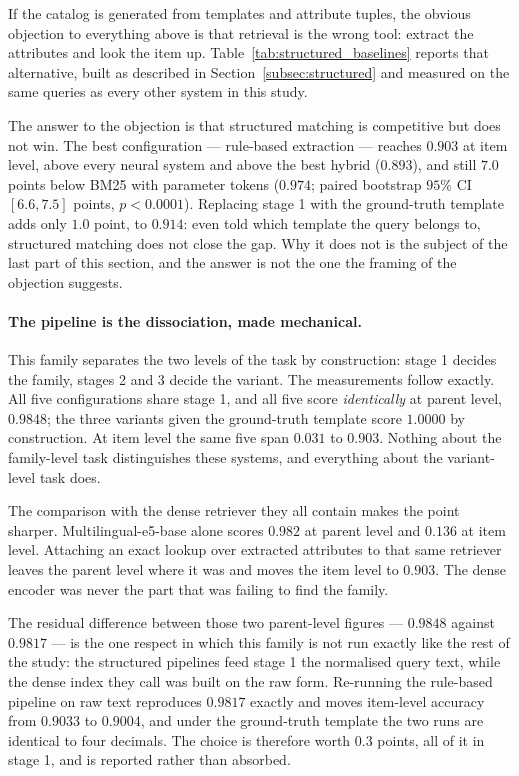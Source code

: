 \documentclass[preprint,12pt]{elsarticle}
\begin{document}
If the catalog is generated from templates and attribute tuples, the obvious objection to everything above is that retrieval is the wrong tool: extract the attributes and look the item up. Table~\ref{tab:structured_baselines} reports that alternative, built as described in Section~\ref{subsec:structured} and measured on the same queries as every other system in this study.



The answer to the objection is that structured matching is competitive but does not win. The best configuration --- rule-based extraction --- reaches $0.903$ at item level, above every neural system and above the best hybrid ($0.893$), and still $7.0$ points below BM25 with parameter tokens ($0.974$; paired bootstrap $95\%$ CI $[6.6, 7.5]$ points, $p < 0.0001$). Replacing stage 1 with the ground-truth template adds only $1.0$ point, to $0.914$: even told which template the query belongs to, structured matching does not close the gap. Why it does not is the subject of the last part of this section, and the answer is not the one the framing of the objection suggests.

\paragraph{The pipeline is the dissociation, made mechanical.}
This family separates the two levels of the task by construction: stage 1 decides the family, stages 2 and 3 decide the variant. The measurements follow exactly. All five configurations share stage 1, and all five score \emph{identically} at parent level, $0.9848$; the three variants given the ground-truth template score $1.0000$ by construction. At item level the same five span $0.031$ to $0.903$. Nothing about the family-level task distinguishes these systems, and everything about the variant-level task does.

The comparison with the dense retriever they all contain makes the point sharper. Multilingual-e5-base alone scores $0.982$ at parent level and $0.136$ at item level. Attaching an exact lookup over extracted attributes to that same retriever leaves the parent level where it was and moves the item level to $0.903$. The dense encoder was never the part that was failing to find the family.

The residual difference between those two parent-level figures --- $0.9848$ against $0.9817$ --- is the one respect in which this family is not run exactly like the rest of the study: the structured pipelines feed stage 1 the normalised query text, while the dense index they call was built on the raw form. Re-running the rule-based pipeline on raw text reproduces $0.9817$ exactly and moves item-level accuracy from $0.9033$ to $0.9004$, and under the ground-truth template the two runs are identical to four decimals. The choice is therefore worth $0.3$ points, all of it in stage 1, and is reported rather than absorbed.
\end{document}
